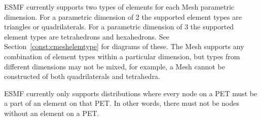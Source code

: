 ESMF currently supports two types of elements for each Mesh parametric dimension. For a parametric dimension of 2 the 
supported element types are triangles or quadrilaterals. For a parametric dimension of 3 the supported element types are tetrahedrons
and hexahedrons. See Section~\ref{const:cmeshelemtype} for diagrams of these. The Mesh supports any combination of element types within a particular
dimension, but types from different dimensions may not be mixed, for example, a Mesh cannot be constructed of both quadrilaterals and tetrahedra.

ESMF currently only supports distributions where every node on a PET must be a part of an element on that PET. In other words, there 
must not be nodes without an element on a PET. 

